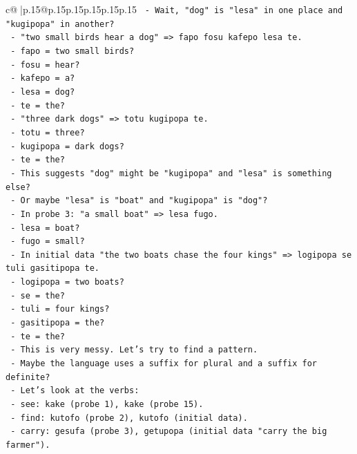 \documentclass{article}
\begin{document}
{\begin{supertabular}{c@{$\;$}|p{.15\linewidth}@{}p{.15\linewidth}p{.15\linewidth}p{.15\linewidth}p{.15\linewidth}p{.15\linewidth}}
{{{\texttt{       {-} Wait, "dog" is "lesa" in one place and "kugipopa" in another?} \\
\texttt{       {-} "two small birds hear a dog" => fapo fosu kafepo lesa te.} \\
\texttt{         {-} fapo = two small birds?} \\
\texttt{         {-} fosu = hear?} \\
\texttt{         {-} kafepo = a?} \\
\texttt{         {-} lesa = dog?} \\
\texttt{         {-} te = the?} \\
\texttt{       {-} "three dark dogs" => totu kugipopa te.} \\
\texttt{         {-} totu = three?} \\
\texttt{         {-} kugipopa = dark dogs?} \\
\texttt{         {-} te = the?} \\
\texttt{       {-} This suggests "dog" might be "kugipopa" and "lesa" is something else?} \\
\texttt{       {-} Or maybe "lesa" is "boat" and "kugipopa" is "dog"?} \\
\texttt{       {-} In probe 3: "a small boat" => lesa fugo.} \\
\texttt{         {-} lesa = boat?} \\
\texttt{         {-} fugo = small?} \\
\texttt{       {-} In initial data "the two boats chase the four kings" => logipopa se tuli gasitipopa te.} \\
\texttt{         {-} logipopa = two boats?} \\
\texttt{         {-} se = the?} \\
\texttt{         {-} tuli = four kings?} \\
\texttt{         {-} gasitipopa = the?} \\
\texttt{         {-} te = the?} \\
\texttt{       {-} This is very messy. Let's try to find a pattern.} \\
\texttt{       {-} Maybe the language uses a suffix for plural and a suffix for definite?} \\
\texttt{       {-} Let's look at the verbs:} \\
\texttt{         {-} see: kake (probe 1), kake (probe 15).} \\
\texttt{         {-} find: kutofo (probe 2), kutofo (initial data).} \\
\texttt{         {-} carry: gesufa (probe 3), getupopa (initial data "carry the big farmer").} \\
}}}
\end{supertabular}}
\end{document}
